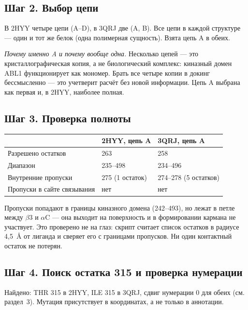 \documentclass[12pt,a4paper]{article}
\newcommand{\code}[1]{{\ttfamily #1}}
\begin{document}
\subsection{Шаг 2. Выбор цепи}

В 2HYY четыре цепи (A--D), в 3QRJ две (A, B). Все цепи в каждой структуре --- один
и тот же белок (одна полимерная сущность). Взята цепь \code{A} в обеих.

\medskip
\noindent\emph{Почему именно A и почему вообще одна.} Несколько цепей --- это
кристаллографическая копия, а не биологический комплекс: киназный домен ABL1
функционирует как мономер. Брать все четыре копии в докинг бессмысленно --- это
учетверит расчёт без новой информации. Цепь A выбрана как первая и, в 2HYY,
наиболее полная.

\subsection{Шаг 3. Проверка полноты}

\begin{center}
\begin{tabular}{L{4.6cm}L{4.9cm}L{4.9cm}}
\toprule
 & \textbf{2HYY, цепь A} & \textbf{3QRJ, цепь A} \\
\midrule
Разрешено остатков & 263 & 258 \\
Диапазон & 235--498 & 234--496 \\
Внутренние пропуски & 275 (1 остаток) & 274--278 (5 остатков) \\
Пропуски в сайте связывания & нет & нет \\
\bottomrule
\end{tabular}
\end{center}

Пропуски попадают в границы киназного домена (242--493), но лежат в петле между
$\beta$3 и $\alpha$C --- она выходит на поверхность и в формировании кармана не
участвует. Это проверено не на глаз: скрипт считает список остатков в радиусе
4{,}5~\AA{} от лиганда и сверяет его с границами пропусков. Ни один контактный
остаток не потерян.

\subsection{Шаг 4. Поиск остатка 315 и проверка нумерации}

Найдено: \code{THR 315} в 2HYY, \code{ILE 315} в 3QRJ, сдвиг нумерации 0 для обеих
(см. раздел~3). Мутация присутствует в координатах, а не только в аннотации.
\end{document}
